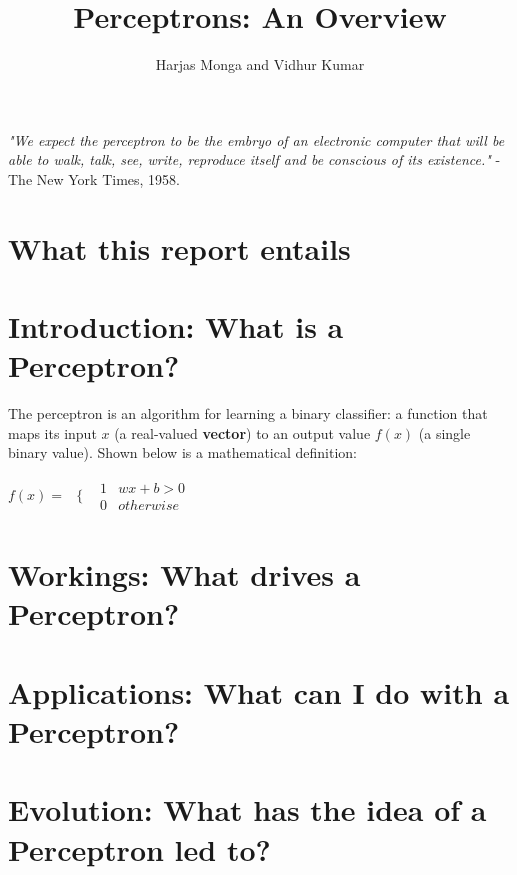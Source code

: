 \documentclass[12pt, titlepage, a4paper]{article}
\title{Perceptrons: An Overview}
\author{Harjas Monga and Vidhur Kumar}
\begin{document}
	\maketitle
	
	\tableofcontents
	
	\newpage

	\textit{"We expect the perceptron to be the embryo of an electronic computer that will be able to walk, talk, see, write, reproduce itself and be conscious of its existence."} - The New York Times, 1958.	
	
	\section{What this report entails}
			
	
	\section{Introduction: What is a Perceptron?}
	
	The perceptron is an algorithm for learning a binary classifier: a function that maps its input $x$ (a real-valued \textbf{vector}) to an output value $f(x)$ (a single binary value). Shown below is a mathematical definition: \\
	
	\begin{center}
		$f(x) = $
		$
\begin{array}{cc}
  \{ & 
    \begin{array}{cc}
    	1 & wx + b > 0 \\
    	0 & otherwise
    \end{array}
\end{array}
		$
	\end{center}
	
	\section{Workings: What drives a Perceptron?}
		
	\section{Applications: What can I do with a Perceptron?}
		
		
	\section{Evolution: What has the idea of a Perceptron led to?}
\end{document}
